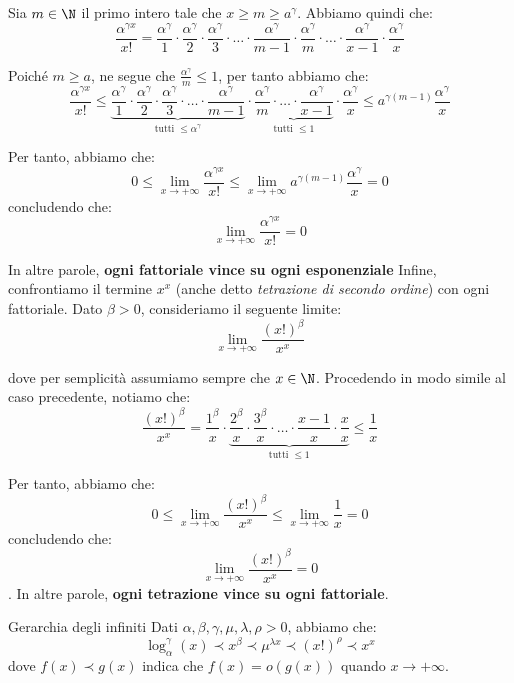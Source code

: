 \documentclass[a4paper, 12pt]{report}
\begin{document}
    Sia $m \in \N$ il primo intero tale che $x \geq m \geq a^\gamma$. Abbiamo quindi che:
    \[ \frac{\alpha^{\gamma x}}{x!} = \frac{\alpha^\gamma}{1} \cdot \frac{\alpha^\gamma}{2} \cdot \frac{\alpha^\gamma}{3} \cdot \ldots \cdot \frac{\alpha^\gamma}{m-1} \cdot \frac{\alpha^\gamma}{m} \cdot \ldots \cdot \frac{\alpha^\gamma}{x-1} \cdot \frac{\alpha^\gamma}{x}\]

    Poiché $m \geq a$, ne segue che $\frac{\alpha^\gamma}{m} \leq 1$, per tanto abbiamo che:
    \[ \frac{\alpha^{\gamma x}}{x!} \leq \underbrace{\frac{\alpha^\gamma}{1} \cdot \frac{\alpha^\gamma}{2} \cdot \frac{\alpha^\gamma}{3} \cdot \ldots \cdot \frac{\alpha^\gamma}{m-1}}_{\text{tutti $\leq \alpha^\gamma$}} \cdot \underbrace{\frac{\alpha^\gamma}{m} \cdot \ldots \cdot \frac{\alpha^\gamma}{x-1}}_{\text{tutti $\leq 1$}} \cdot \frac{\alpha^\gamma}{x} \leq a^{\gamma(m-1)} \frac{\alpha^\gamma}{x}\]

    Per tanto, abbiamo che:
    \[0 \leq \lim_{x \to +\infty} \frac{\alpha^{\gamma x}}{x!} \leq \lim_{x \to +\infty} a^{\gamma(m-1)} \frac{\alpha^\gamma}{x} = 0\]
    concludendo che:
    \[\lim_{x \to +\infty} \frac{\alpha^{\gamma x}}{x!} = 0\]
    
    In altre parole, \textbf{ogni fattoriale vince su ogni esponenziale} Infine, confrontiamo il termine $x^x$ (anche detto \textit{tetrazione di secondo ordine}) con ogni fattoriale. Dato $\beta > 0$, consideriamo il seguente limite:
    \[\lim_{x \to +\infty} \frac{(x!)^\beta}{x^x}\]

    dove per semplicità assumiamo sempre che $x \in \N$. Procedendo in modo simile al caso precedente, notiamo che:
    \[ \frac{(x!)^\beta}{x^x} = \frac{1^\beta}{x} \cdot \underbrace{\frac{2^\beta}{x} \cdot \frac{3^\beta}{x} \cdot \ldots \cdot \frac{x-1}{x} \cdot \frac{x}{x}}_{\text{tutti $\leq 1$}} \leq \frac{1}{x}\]

    Per tanto, abbiamo che:
    \[0 \leq \lim_{x \to +\infty} \frac{(x!)^\beta}{x^x} \leq \lim_{x \to +\infty} \frac{1}{x} = 0\]
    concludendo che:
    \[\lim_{x \to +\infty} \frac{(x!)^\beta}{x^x} = 0\]. In altre parole, \textbf{ogni tetrazione vince su ogni fattoriale}.

    \begin{framedprop}{Gerarchia degli infiniti}
        Dati $\alpha, \beta, \gamma, \mu, \lambda, \rho > 0$, abbiamo che:
        \[\log_{\alpha}^\gamma(x) \prec x^\beta \prec \mu^{\lambda x} \prec (x!)^{\rho} \prec x^x\]
        dove $f(x) \prec g(x)$ indica che $f(x) = o(g(x))$ quando $x \to +\infty$.
    \end{framedprop}
\end{document}
